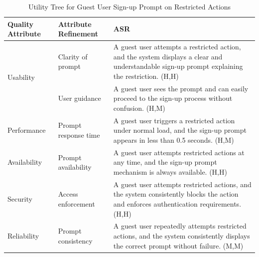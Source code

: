 \documentclass{article}
\begin{document}
\begin{table}[H]
    \centering
    \caption{Utility Tree for Guest User Sign-up Prompt on Restricted Actions}
    \begin{tabular}{|p{3cm}|p{4cm}|p{7cm}|}
        \hline
        \textbf{Quality Attribute} & \textbf{Attribute Refinement}                                                                                                                  & \textbf{ASR} \\
        \hline

        \multirow{2}{*}{Usability}
                                   & Clarity of prompt
                                   & A guest user attempts a restricted action, and the system displays a clear and understandable sign-up prompt explaining the restriction. (H,H)                \\
        \cline{2-3}
                                   & User guidance
                                   & A guest user sees the prompt and can easily proceed to the sign-up process without confusion. (H,M)                                                           \\
        \hline

        Performance
                                   & Prompt response time
                                   & A guest user triggers a restricted action under normal load, and the sign-up prompt appears in less than 0.5 seconds. (H,M)                                   \\
        \hline

        Availability
                                   & Prompt availability
                                   & A guest user attempts restricted actions at any time, and the sign-up prompt mechanism is always available. (H,H)                                             \\
        \hline

        Security
                                   & Access enforcement
                                   & A guest user attempts restricted actions, and the system consistently blocks the action and enforces authentication requirements. (H,H)                       \\
        \hline

        Reliability
                                   & Prompt consistency
                                   & A guest user repeatedly attempts restricted actions, and the system consistently displays the correct prompt without failure. (M,M)                           \\
        \hline
    \end{tabular}
\end{table}
\end{document}
